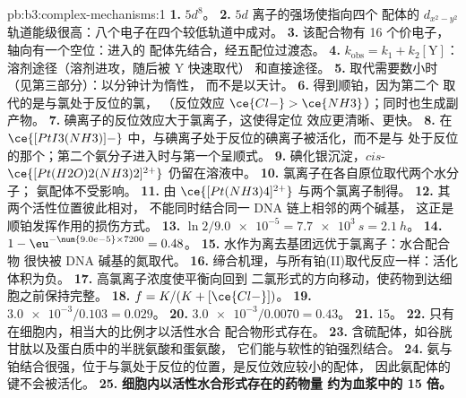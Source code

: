 \begin{solution}{pb:b3:complex-mechanisms:1}
\textbf{1.} $5d^8$。
\textbf{2.} $5d$ 离子的强场使指向四个
配体的 $d_{x^2-y^2}$ 轨道能级很高：八个电子在四个较低轨道中成对。
\textbf{3.} 该配合物有 16 个价电子，轴向有一个空位：进入的
配体先结合，经五配位过渡态。
\textbf{4.} $k_{\mathrm{obs}} = k_1 + k_2[\mathrm Y]$：溶剂途径（溶剂进攻，随后被 Y 快速取代）
和直接途径。
\textbf{5.} 取代需要数小时（见第三部分）：以分钟计为惰性，
而不是以天计。
\textbf{6.} 得到顺铂，因为第二个  取代的是与氯处于反位的氯，
（反位效应 $\ce{Cl-} > \ce{NH3}$）；同时也生成副产物。
\textbf{7.} 碘离子的反位效应大于氯离子，这使得定位
效应更清晰、更快。
\textbf{8.} 在 $\ce{[PtI3(NH3)]-}$ 中，与碘离子处于反位的碘离子被活化，而不是与
 处于反位的那个；第二个氨分子进入时与第一个呈顺式。
\textbf{9.} 碘化银沉淀，$cis$-$\ce{[Pt(H2O)2(NH3)2]^{2+}}$ 仍留在溶液中。
\textbf{10.} 氯离子在各自原位取代两个水分子；
氨配体不受影响。
\textbf{11.} 由 $\ce{[Pt(NH3)4]^{2+}}$ 与两个氯离子制得。
\textbf{12.} 其两个活性位置彼此相对，
不能同时结合同一 DNA 链上相邻的两个碱基，
这正是顺铂发挥作用的损伤方式。
\textbf{13.} $\ln2/\num{9.0e-5} = \qty{7.7e3}{s} = \qty{2.1}{h}$。
\textbf{14.} $1 - \eu^{-\num{9.0e-5} \times 7200} = 0.48$。
\textbf{15.} 水作为离去基团远优于氯离子：水合配合物
很快被 DNA 碱基的氮取代。
\textbf{16.} 缔合机理，与所有铂(II)取代反应一样：活化
体积为负。
\textbf{17.} 高氯离子浓度使平衡向回到
二氯形式的方向移动，使药物到达细胞之前保持完整。
\textbf{18.} $f = K/(K + [\ce{Cl-}])$。
\textbf{19.} $\num{3.0e-3}/0.103 = 0.029$。
\textbf{20.} $\num{3.0e-3}/0.0070 = 0.43$。
\textbf{21.} 15。
\textbf{22.} 只有在细胞内，相当大的比例才以活性水合
配合物形式存在。
\textbf{23.} 含硫配体，如谷胱甘肽以及蛋白质中的半胱氨酸和蛋氨酸，
它们能与软性的铂强烈结合。
\textbf{24.} 氨与铂结合很强，位于与氯处于反位的位置，是反位效应较小的配体，
因此氨配体的键不会被活化。
\textbf{25.} \textbf{细胞内以活性水合形式存在的药物量
约为血浆中的 15 倍。}
\end{solution}

